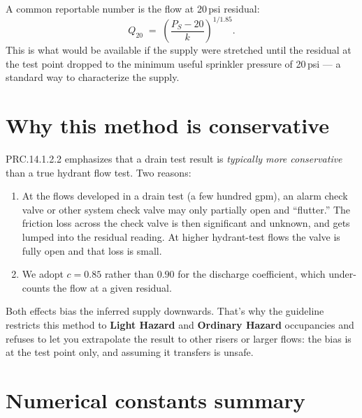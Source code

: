\documentclass[11pt]{article}
\begin{document}
A common reportable number is the flow at 20\,psi residual:
\begin{equation}
Q_{20} \;=\; \left(\dfrac{P_S - 20}{k}\right)^{1/1.85}.
\end{equation}
This is what would be available if the supply were stretched until the
residual at the test point dropped to the minimum useful sprinkler
pressure of 20\,psi --- a standard way to characterize the supply.

\section{Why this method is conservative}

PRC.14.1.2.2 emphasizes that a drain test result is \emph{typically more
conservative} than a true hydrant flow test. Two reasons:

\begin{enumerate}
  \item At the flows developed in a drain test (a few hundred gpm), an
        alarm check valve or other system check valve may only
        partially open and ``flutter.'' The friction loss across the
        check valve is then significant and unknown, and gets lumped
        into the residual reading. At higher hydrant-test flows the
        valve is fully open and that loss is small.
  \item We adopt $c=0.85$ rather than $0.90$ for the discharge
        coefficient, which under-counts the flow at a given residual.
\end{enumerate}

Both effects bias the inferred supply downwards. That's why the
guideline restricts this method to \textbf{Light Hazard} and
\textbf{Ordinary Hazard} occupancies and refuses to let you extrapolate
the result to other risers or larger flows: the bias is at the test
point only, and assuming it transfers is unsafe.

\section{Numerical constants summary}
\end{document}

